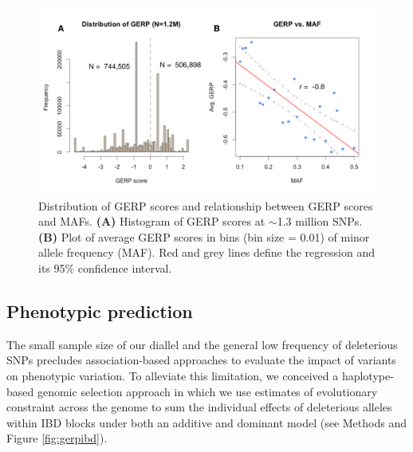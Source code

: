 \documentclass[9pt,twocolumn,twoside]{gsajnl}
\begin{document}
\begin{figure}[htbp]
\centering
\includegraphics[width=\linewidth]{Figure_gerpmaf.pdf}
\caption{Distribution of GERP scores and relationship between GERP scores and MAFs. \textbf{(A)} Histogram of GERP scores at $\sim$1.3 million SNPs. \textbf{(B)} Plot of average GERP scores in bins (bin size = 0.01) of minor allele frequency (MAF). Red and grey lines define the regression and its 95\% confidence interval.}
\label{fig:gerpmaf}
\end{figure}


\subsection*{Phenotypic prediction}

The small sample size of our diallel and the general low frequency of deleterious SNPs precludes association-based approaches to evaluate the impact of variants on phenotypic variation.
To alleviate this limitation, we conceived a haplotype-based genomic selection approach in which we use estimates of evolutionary constraint across the genome \citep{rodgers2015recombination} to sum the individual effects of deleterious alleles within IBD blocks under both an additive and dominant model (see Methods and Figure \ref{fig:gerpibd}). 
\end{document}
